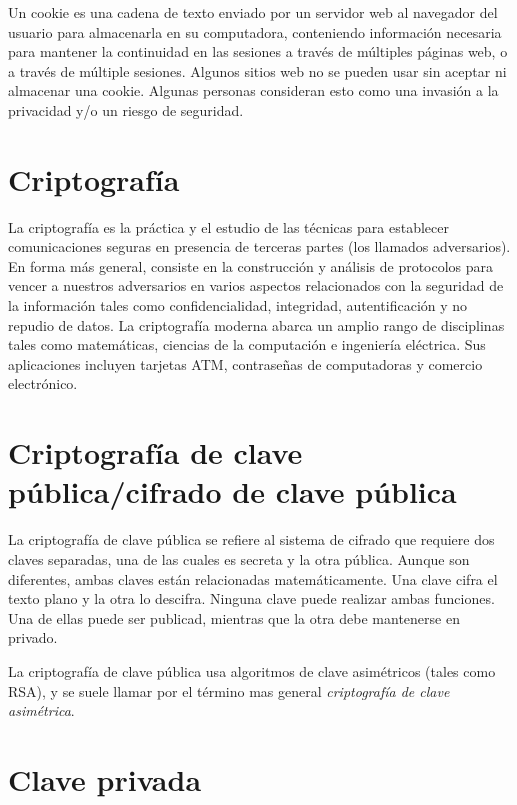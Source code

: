 \documentclass[10pt,a5paper,twoside,,]{book}
\begin{document}
Un cookie es una cadena de texto enviado por un servidor web al
navegador del usuario para almacenarla en su computadora, conteniendo
información necesaria para mantener la continuidad en las sesiones a
través de múltiples páginas web, o a través de múltiple sesiones.
Algunos sitios web no se pueden usar sin aceptar ni almacenar una
cookie. Algunas personas consideran esto como una invasión a la
privacidad y/o un riesgo de seguridad.

\section{Criptografía}\label{criptografuxeda}

La criptografía es la práctica y el estudio de las técnicas para
establecer comunicaciones seguras en presencia de terceras partes (los
llamados adversarios). En forma más general, consiste en la construcción
y análisis de protocolos para vencer a nuestros adversarios en varios
aspectos relacionados con la seguridad de la información tales como
confidencialidad, integridad, autentificación y no repudio de datos. La
criptografía moderna abarca un amplio rango de disciplinas tales como
matemáticas, ciencias de la computación e ingeniería eléctrica. Sus
aplicaciones incluyen tarjetas ATM, contraseñas de computadoras y
comercio electrónico.

\section{Criptografía de clave pública/cifrado de clave
pública}\label{criptografuxeda-de-clave-puxfablicacifrado-de-clave-puxfablica}

La criptografía de clave pública se refiere al sistema de cifrado que
requiere dos claves separadas, una de las cuales es secreta y la otra
pública. Aunque son diferentes, ambas claves están relacionadas
matemáticamente. Una clave cifra el texto plano y la otra lo descifra.
Ninguna clave puede realizar ambas funciones. Una de ellas puede ser
publicad, mientras que la otra debe mantenerse en privado.

La criptografía de clave pública usa algoritmos de clave asimétricos
(tales como RSA), y se suele llamar por el término mas general
\emph{criptografía de clave asimétrica}.

\section{Clave privada}\label{clave-privada}
\end{document}
